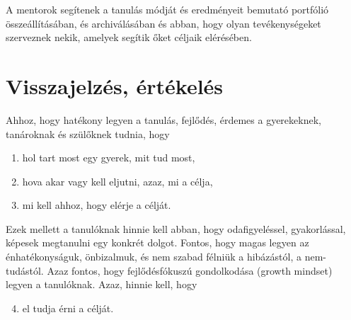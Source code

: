 A mentorok segítenek a tanulás módját és eredményeit bemutató portfólió összeállításában, és archiválásában és abban, hogy olyan tevékenységeket szerveznek nekik, amelyek segítik őket céljaik elérésében.

\section{Visszajelzés, értékelés}
\label{sec:ertekeles}
Ahhoz, hogy hatékony legyen a tanulás, fejlődés, érdemes a gyerekeknek, tanároknak és szülőknek tudnia, hogy
\begin{enumerate}
\item hol tart most egy gyerek, mit tud most,
\item hova akar vagy kell eljutni, azaz, mi a célja,
\item mi kell ahhoz, hogy elérje a célját.
\end{enumerate}
Ezek mellett a tanulóknak hinnie kell abban, hogy odafigyeléssel, gyakorlással, képesek megtanulni egy konkrét dolgot. Fontos, hogy magas legyen az énhatékonyságuk, önbizalmuk, és nem szabad félniük a hibázástól, a nem-tudástól. Azaz fontos, hogy fejlődésfókuszú gondolkodása (growth mindset)\cite{growthmindset} legyen a tanulóknak. Azaz, hinnie kell, hogy
\begin{enumerate}
  \setcounter{enumi}{3}
  \item el tudja érni a célját.
\end{enumerate}

